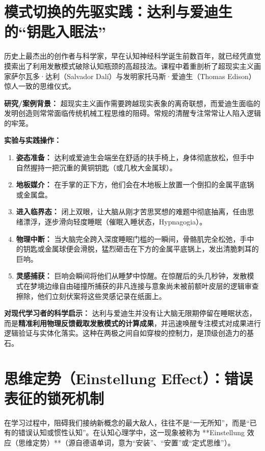 \documentclass[12pt,a4paper,openany]{ctexbook}
\begin{document}
\section{模式切换的先驱实践：达利与爱迪生的“钥匙入眠法”}

历史上最杰出的创作者与科学家，早在认知神经科学诞生前数百年，就已经凭直觉摸索出了利用发散模式破除认知瓶颈的高超技法。课程中着重剖析了超现实主义画家萨尔瓦多·达利（Salvador Dalí）与发明家托马斯·爱迪生（Thomas Edison）惊人一致的思维仪式。

\begin{casebox}
\textbf{研究/案例背景：} 
超现实主义画作需要跨越现实表象的离奇联想，而爱迪生面临的发明创造则常常面临传统机械工程思维的阻碍。常规的清醒专注常常让人陷入逻辑的牢笼。

\textbf{实验与实践操作：}
\begin{enumerate}
    \item \textbf{姿态准备：} 达利或爱迪生会端坐在舒适的扶手椅上，身体彻底放松，但手中自然握持一把沉重的黄铜钥匙（或几枚大金属球）。
    \item \textbf{地板媒介：} 在手掌的正下方，他们会在木地板上放置一个倒扣的金属平底锅或金属盘。
    \item \textbf{进入临界态：} 闭上双眼，让大脑从刚才苦思冥想的难题中彻底抽离，任由思绪漂浮，逐步滑向轻度睡眠（催眠入睡状态，Hypnagogia）。
    \item \textbf{物理中断：} 当大脑完全跨入深度睡眠门槛的一瞬间，骨骼肌完全松弛，手中的钥匙或金属球便会滑脱，猛烈砸击在下方的金属平底锅上，发出清脆刺耳的巨响。
    \item \textbf{灵感捕获：} 巨响会瞬间将他们从睡梦中惊醒。在惊醒后的头几秒钟，发散模式在梦境边缘自由碰撞所捕获的非凡连接与意象尚未被前额叶皮层的逻辑审查擦除，他们立刻伏案将这些灵感记录在纸面上。
\end{enumerate}

\textbf{对现代学习者的科学启示：}
达利与爱迪生并没有让大脑无限期停留在睡眠状态，而是\textbf{精准利用物理反馈截取发散模式的计算成果}，并迅速唤醒专注模式对成果进行逻辑验证与实体化落实。这种在两极之间自如穿梭的控制力，是顶级创造力的基石。
\end{casebox}

\section{思维定势（Einstellung Effect）：错误表征的锁死机制}

在学习过程中，阻碍我们接纳新概念的最大敌人，往往不是“一无所知”，而是“已有的错误认知或惯性认知”。在认知心理学中，这一现象被称为 **Einstellung 效应（思维定势）**（源自德语单词，意为“安装”、“安置”或“定式思维”）。
\end{document}
